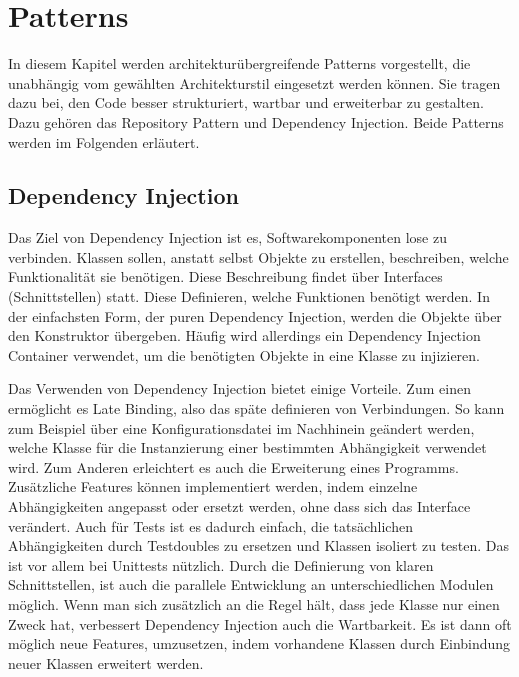 \section{Patterns}
In diesem Kapitel werden architekturübergreifende Patterns vorgestellt, die unabhängig vom gewählten Architekturstil eingesetzt werden können. Sie tragen dazu bei, den Code besser strukturiert, wartbar und erweiterbar zu gestalten. Dazu gehören das Repository Pattern und Dependency Injection. Beide Patterns werden im Folgenden erläutert.

\subsection{Dependency Injection}
Das Ziel von Dependency Injection ist es, Softwarekomponenten lose zu verbinden. Klassen sollen, anstatt selbst Objekte zu erstellen, beschreiben, welche Funktionalität sie benötigen. Diese Beschreibung findet über Interfaces (Schnittstellen) statt. Diese Definieren, welche Funktionen benötigt werden. In der einfachsten Form, der puren Dependency Injection, werden die Objekte über den Konstruktor übergeben. Häufig wird allerdings ein Dependency Injection Container verwendet, um die benötigten Objekte in eine Klasse zu injizieren.

Das Verwenden von Dependency Injection bietet einige Vorteile. Zum einen ermöglicht es Late Binding, also das späte definieren von Verbindungen. So kann zum Beispiel über eine Konfigurationsdatei im Nachhinein geändert werden, welche Klasse für die Instanzierung einer bestimmten Abhängigkeit verwendet wird. Zum Anderen erleichtert es auch die Erweiterung eines Programms. Zusätzliche Features können implementiert werden, indem einzelne Abhängigkeiten angepasst oder ersetzt werden, ohne dass sich das Interface verändert. Auch für Tests ist es dadurch einfach, die tatsächlichen Abhängigkeiten durch Testdoubles zu ersetzen und Klassen isoliert zu testen. Das ist vor allem bei Unittests nützlich. Durch die Definierung von klaren Schnittstellen, ist auch die parallele Entwicklung an unterschiedlichen Modulen möglich. Wenn man sich zusätzlich an die Regel hält, dass jede Klasse nur einen Zweck hat, verbessert Dependency Injection auch die Wartbarkeit. Es ist dann oft möglich neue Features, umzusetzen, indem vorhandene Klassen durch Einbindung neuer Klassen erweitert werden.
\cite{seemann_dependency_2019}

